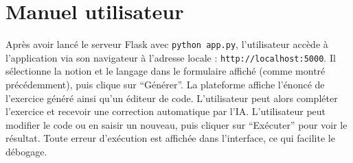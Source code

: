 \documentclass[a4paper, 12pt, twoside]{article}
\begin{document}
	\section{Manuel utilisateur}
Après avoir lancé le serveur Flask avec \texttt{python app.py}, l'utilisateur accède à l'application via son navigateur à l'adresse locale : \texttt{http://localhost:5000}. Il sélectionne la notion et le langage dans le formulaire affiché (comme montré précédemment), puis clique sur ``Générer''. La plateforme affiche l'énoncé de l'exercice généré ainsi qu'un éditeur de code. L'utilisateur peut alors compléter l'exercice et recevoir une correction automatique par l'IA. L'utilisateur peut modifier le code ou en saisir un nouveau, puis cliquer sur ``Exécuter'' pour voir le résultat. Toute erreur d'exécution est affichée dans l'interface, ce qui facilite le débogage.
\end{document}
